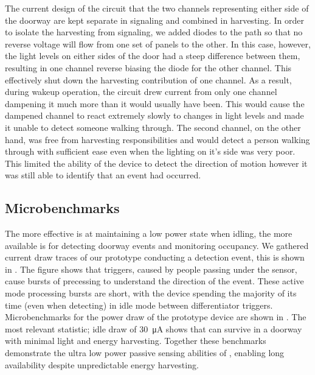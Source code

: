 The current design of the \sysname circuit that the two channels representing either side of the doorway are kept separate in signaling and combined in harvesting. 
In order to isolate the harvesting from signaling, we added diodes to the path so that no reverse voltage will flow from one set of panels to the other. 
In this case, however, the light levels on either sides of the door had a steep difference between them, resulting in one channel reverse biasing the diode for the other channel. 
This effectively shut down the harvesting contribution of one channel. As a result, during wakeup operation, the circuit drew current from only one channel dampening it much more than it would usually have been. 
This would cause the dampened channel to react extremely slowly to changes in light levels and made it unable to detect someone walking through. 
The second channel, on the other hand, was free from harvesting responsibilities and would detect a person walking through with sufficient ease even when the lighting on it's side was very poor. 
This limited the ability of the device to detect the direction of motion however it was still able to identify that an event had occurred.

\subsection{Microbenchmarks}
The more effective \sysname is at maintaining a low power state when idling, the more available \sysname is for detecting doorway events and monitoring occupancy.
We gathered current draw traces of our \sysname prototype conducting a detection event, this is shown in .
The figure shows that triggers, caused by people passing under the sensor, cause bursts of precessing to understand the direction of the event.
These active mode processing bursts are short, with the device spending the majority of its time (even when detecting) in idle mode between differentiator triggers. 
Microbenchmarks for the power draw of the \sysname prototype device are shown in .
The most relevant statistic; idle draw of \SI{30}{\micro\ampere} shows that \sysname can survive in a doorway with minimal light and energy harvesting.
Together these benchmarks demonstrate the ultra low power passive sensing abilities of \sysname, enabling long availability despite unpredictable energy harvesting.  

